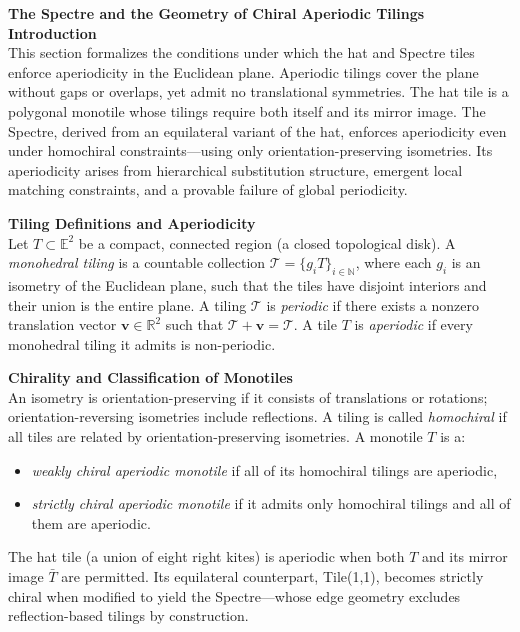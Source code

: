 \begin{technical}
{\Large\textbf{The Spectre and the Geometry of Chiral Aperiodic Tilings}}\\[0.7em]

\textbf{Introduction}\\[0.5em]
This section formalizes the conditions under which the hat and Spectre tiles enforce aperiodicity in the Euclidean plane. Aperiodic tilings cover the plane without gaps or overlaps, yet admit no translational symmetries. The hat tile is a polygonal monotile whose tilings require both itself and its mirror image. The Spectre, derived from an equilateral variant of the hat, enforces aperiodicity even under homochiral constraints—using only orientation-preserving isometries. Its aperiodicity arises from hierarchical substitution structure, emergent local matching constraints, and a provable failure of global periodicity.

\textbf{Tiling Definitions and Aperiodicity}\\[0.5em]
Let \( T \subset \mathbb{E}^2 \) be a compact, connected region (a closed topological disk). A \emph{monohedral tiling} is a countable collection \( \mathcal{T} = \{g_i T\}_{i \in \mathbb{N}} \), where each \( g_i \) is an isometry of the Euclidean plane, such that the tiles have disjoint interiors and their union is the entire plane. A tiling \( \mathcal{T} \) is \emph{periodic} if there exists a nonzero translation vector \( \mathbf{v} \in \mathbb{R}^2 \) such that \( \mathcal{T} + \mathbf{v} = \mathcal{T} \). A tile \( T \) is \emph{aperiodic} if every monohedral tiling it admits is non-periodic.

\textbf{Chirality and Classification of Monotiles}\\[0.5em]
An isometry is orientation-preserving if it consists of translations or rotations; orientation-reversing isometries include reflections. A tiling is called \emph{homochiral} if all tiles are related by orientation-preserving isometries. A monotile \( T \) is a:
\begin{itemize}
\item \emph{weakly chiral aperiodic monotile} if all of its homochiral tilings are aperiodic,
\item \emph{strictly chiral aperiodic monotile} if it admits only homochiral tilings and all of them are aperiodic.
\end{itemize}
The hat tile (a union of eight right kites) is aperiodic when both \( T \) and its mirror image \( \bar{T} \) are permitted. Its equilateral counterpart, Tile(1,1), becomes strictly chiral when modified to yield the Spectre—whose edge geometry excludes reflection-based tilings by construction.


\end{technical}

